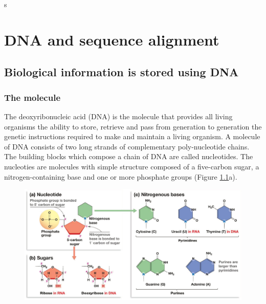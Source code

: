s\chapter{DNA and sequence alignment}
\label{chap1:DNA-align}
\section{Biological information is stored using DNA}
\label{sec:chap1:DNA}
\subsection{The molecule}
\label{sec:chap1:DNA-molecule}
The deoxyribonucleic acid (DNA) is the molecule that provides all
living organisms the ability to store, retrieve and pass from
generation to generation the genetic instructions required to make and
maintain a living organism. A molecule of DNA consists of two long
strands of complementary poly-nucleotide chains. The building blocks
which compose a chain of DNA are called nucleotides. The nucleoties are
molecules with simple structure composed of a five-carbon sugar, a
nitrogen-containing base and one or more phosphate groups (Figure
\ref{fig:chap1:nucleotide}a).

\begin{figure}[h]
	\begin{minipage}[b]{\linewidth}
	  \centering
	  \includegraphics[width=\textwidth]{figures/chap1_nucleotide}
	  \caption{}
	  \label{fig:chap1:nucleotide}
   \end{minipage}
\end{figure}

